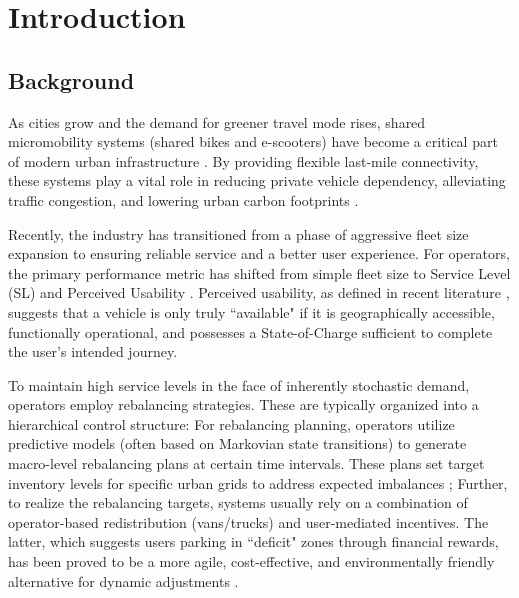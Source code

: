 \chapter{Introduction}
\label{chapter:introduction}

\section{Background}

As cities grow and the demand for greener travel mode rises, shared micromobility systems (shared bikes and e-scooters) have become a critical part of modern urban infrastructure \parencite{shaheen2021shared}. By providing flexible last-mile connectivity, these systems play a vital role in reducing private vehicle dependency, alleviating traffic congestion, and lowering urban carbon footprints \parencite{zhong2022bikecap, zhang2018environmental}. 

Recently, the industry has transitioned from a phase of aggressive fleet size expansion to ensuring reliable service and a better user experience. For operators, the primary performance metric has shifted from simple fleet size to Service Level (SL) and Perceived Usability \parencite{momen2025}. Perceived usability, as defined in recent literature \parencite{momen2025}, suggests that a vehicle is only truly ``available" if it is geographically accessible, functionally operational, and possesses a State-of-Charge sufficient to complete the user's intended journey.

To maintain high service levels in the face of inherently stochastic demand, operators employ rebalancing strategies. These are typically organized into a hierarchical control structure: For rebalancing planning, operators utilize predictive models (often based on Markovian state transitions) to generate macro-level rebalancing plans at certain time intervals. These plans set target inventory levels for specific urban grids to address expected imbalances \parencite{momen2025}; Further, to realize the rebalancing targets, systems usually rely on a combination of operator-based redistribution (vans/trucks) and user-mediated incentives. The latter, which suggests users parking in ``deficit" zones through financial rewards, has been proved to be a more agile, cost-effective, and environmentally friendly alternative for dynamic adjustments \parencite{tan2023}.



